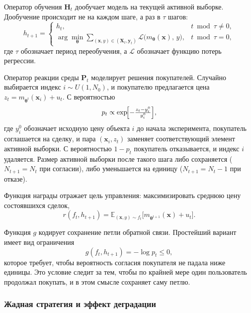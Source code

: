 \documentclass[a4paper,14pt,oneside,openany]{extarticle}
\newcommand{\bH}{\mathbf{H}}
\newcommand{\bP}{\mathbf{P}}
\newcommand{\bX}{\mathbf{X}}
\newcommand{\bx}{\mathbf{x}}
\newcommand{\by}{\mathbf{y}}
\newcommand{\cL}{\mathcal{L}}
\newcommand{\bbE}{\mathbb{E}}
\newcommand{\btheta}{\boldsymbol{\theta}}
\begin{document}
Оператор обучения $\bH_t$ дообучает модель на текущей активной выборке. Дообучение происходит не на каждом шаге, а раз в $\tau$ шагов:
\begin{equation}
    h_{t+1} = \begin{cases}
        h_t, & t \bmod \tau \ne 0,\\
        \arg\min_{\btheta} \sum_{(\bx, y) \in (\bX_t, \by_t)} \cL\bigl(m_{\btheta}(\bx),\, y\bigr), & t \bmod \tau = 0,
    \end{cases}
    \label{eq:H_pricing}
\end{equation}
где $\tau$ обозначает период переобучения, а $\cL$ обозначает функцию потерь регрессии.

Оператор реакции среды $\bP_t$ моделирует решения покупателей. Случайно выбирается индекс $i \sim U(1, N_0)$, и покупателю предлагается цена $z_t = m_{\btheta^t}(\bx_i) + u_t$. С вероятностью
\begin{equation}
    p_t \propto \exp\!\Bigl[-\tfrac{z_t - y_i^0}{y_i^0}\Bigr], \label{eq:p_pricing}
\end{equation}
где $y_i^0$ обозначает исходную цену объекта $i$ до начала эксперимента, покупатель соглашается на сделку, и пара $(\bx_i, z_t)$ заменяет соответствующий элемент активной выборки. С вероятностью $1 - p_t$ покупатель отказывается, и индекс $i$ удаляется. Размер активной выборки после такого шага либо сохраняется ($N_{t+1} = N_t$ при согласии), либо уменьшается на единицу ($N_{t+1} = N_t - 1$ при отказе).

Функция награды отражает цель управления: максимизировать среднюю цену состоявшихся сделок,
\begin{equation}
    r(f_t, h_{t+1}) = \bbE_{(\bx, y) \sim f_t}\bigl[m_{\btheta^{t+1}}(\bx) + u_t\bigr]. \label{eq:r_pricing}
\end{equation}

Функция $g$ кодирует сохранение петли обратной связи. Простейший вариант имеет вид ограничения
\begin{equation}
    g(f_t, h_{t+1}) = -\log p_t \le 0, \label{eq:g_pricing_naive}
\end{equation}
которое требует, чтобы вероятность согласия покупателя не падала ниже единицы. Это условие следит за тем, чтобы по крайней мере один пользователь продолжал покупать, и в этом смысле сохраняет саму петлю.

\subsubsection{Жадная стратегия и эффект деградации}
\end{document}
